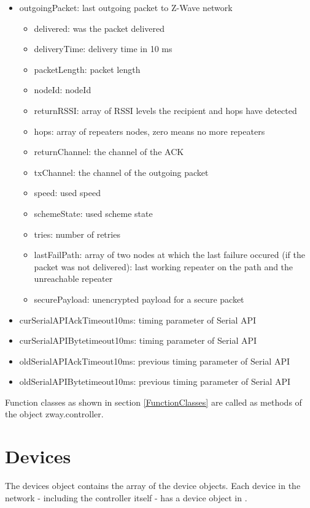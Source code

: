 \begin {itemize}
\begin {itemize}
\begin {itemize}
\item  outgoingPacket: last outgoing packet to Z-Wave network
\begin {itemize}
\item  delivered: was the packet delivered
\item  deliveryTime: delivery time in 10 ms
\item  packetLength: packet length
\item  nodeId: nodeId
\item  returnRSSI: array of RSSI levels the recipient and hops have detected
\item  hops: array of repeaters nodes, zero means no more repeaters
\item  returnChannel: the channel of the ACK
\item  txChannel: the channel of the outgoing packet
\item  speed: used speed
\item  schemeState: used scheme state
\item  tries: number of retries
\item  lastFailPath: array of two nodes at which the last failure occured (if the packet was not delivered): last working repeater on the path and the unreachable repeater
\item  securePayload: unencrypted payload for a secure packet
\end {itemize}

\item  curSerialAPIAckTimeout10ms: timing parameter of Serial API
\item  curSerialAPIBytetimeout10ms: timing parameter of Serial API
\item  oldSerialAPIAckTimeout10ms: previous timing parameter of Serial API
\item  oldSerialAPIBytetimeout10ms: previous timing parameter of Serial API
\end {itemize}

\end {itemize}
\end {itemize}

Function classes as shown in section \ref{FunctionClasses} are called as methods of the object zway.controller.


\section{Devices}

The devices object contains the array of the device objects. Each device in the network - including the 
controller itself -  has a device object in \zway.

